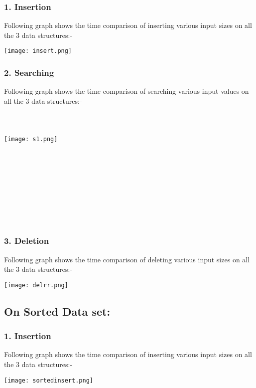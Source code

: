 \documentclass[10pt,a4paper]{article}
\begin{document}
\subsubsection*{1. Insertion}

Following graph shows the time comparison of inserting various input sizes on all the 3 data structures:-
	

\texttt{[image: insert.png]} 


\subsubsection*{2. Searching}

Following graph shows the time comparison of searching various input values on all the 3 data structures:-\\ \\ \\ \\ 


\texttt{[image: s1.png]}  \\ 


\subsubsection*{\\ \\ \\ \\ \\ \\ \\ 3. Deletion}

Following graph shows the time comparison of deleting various input sizes on all the 3 data structures:-


\texttt{[image: delrr.png]} 



\subsection*{On Sorted Data set:}

\subsubsection*{1. Insertion}

Following graph shows the time comparison of inserting various input sizes on all the 3 data structures:-
 

\texttt{[image: sortedinsert.png]}  
\end{document}
